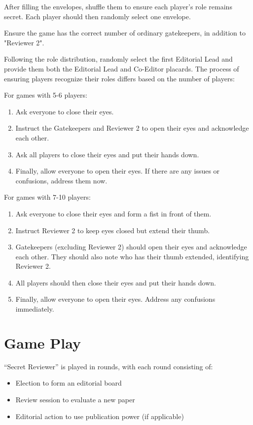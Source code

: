 \documentclass[sigplan,screen,nonacm]{acmart}
\begin{document}
After filling the envelopes, shuffle them to ensure each player's role remains secret. Each player should then randomly select one envelope.

Ensure the game has the correct number of ordinary gatekeepers, in addition to "Reviewer 2".

Following the role distribution, randomly select the first Editorial Lead and provide them both the Editorial Lead and Co-Editor placards. The process of ensuring players recognize their roles differs based on the number of players:

For games with 5-6 players:
\begin{enumerate}
	\item Ask everyone to close their eyes.
	\item Instruct the Gatekeepers and Reviewer 2 to open their eyes and acknowledge each other.
	\item Ask all players to close their eyes and put their hands down.
	\item Finally, allow everyone to open their eyes. If there are any issues or confusions, address them now.
\end{enumerate}

For games with 7-10 players:
\begin{enumerate}
	\item Ask everyone to close their eyes and form a fist in front of them.
	\item Instruct Reviewer 2 to keep eyes closed but extend their thumb.
	\item Gatekeepers (excluding Reviewer 2) should open their eyes and acknowledge each other. They should also note who has their thumb extended, identifying Reviewer 2.
	\item All players should then close their eyes and put their hands down.
	\item Finally, allow everyone to open their eyes. Address any confusions immediately.
\end{enumerate}

\section{Game Play}
``Secret Reviewer'' is played in rounds, with each round consisting of:
\begin{itemize}
	\item Election to form an editorial board
	\item Review session to evaluate a new paper
	\item Editorial action to use publication power (if applicable)
\end{itemize}
\end{document}
